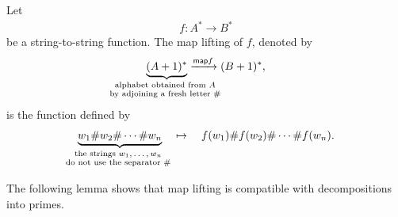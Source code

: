 \begin{definition}\label{def:map-lifting}
    Let 
    \begin{align*}
    f : A^* \to B^*
    \end{align*}
    be a string-to-string function. The map lifting of $f$, denoted by 
    \begin{align*}
    \myunderbrace{(A+1)^*}{alphabet obtained from $A$ \\ by adjoining a fresh letter $\#$} \xrightarrow{\map f} (B+1)^*,
\end{align*}
     is the function defined by 
         \begin{align*}
    \myunderbrace{w_1 \# w_2 \# \cdots \# w_n}{the strings $w_1,\ldots,w_n$ \\ do not  use the separator $\#$} 
    \quad \mapsto \quad 
    f(w_1) \# f(w_2) \# \cdots \# f(w_n).
    \end{align*}
\end{definition}
  The following lemma shows that map lifting is compatible with decompositions into primes. 

